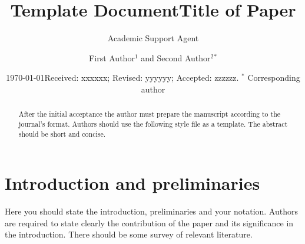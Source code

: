 \documentclass{article}
\title{Template Document}
\author{Academic Support Agent}
\date{\today}
\begin{document}
\maketitle

\setcounter{page}{1}




\centerline{}

\centerline{}

\title[Short Title]{Title of Paper}

\author[F. Author, S. Author]{First Author$^1$ and Second Author$^2$$^{*}$}

\address{$^{1}$ Department of Mathematics, University of California, San Diego, USA.}
\email{\textcolor[rgb]{0.00,0.00,0.84}{first@amcs.org}}

\address{$^{2}$ Department of Statistics, Moscow State University, Moscow, Russia}
\email{\textcolor[rgb]{0.00,0.00,0.84}{second@amcs.org}}




\date{Received: xxxxxx; Revised: yyyyyy; Accepted: zzzzzz.
\newline \indent $^{*}$ Corresponding author}

\begin{abstract}
After the initial acceptance the author must prepare the manuscript according to the journal's format. Authors should use the following style file as a template. The abstract should be short and concise.
\end{abstract} \maketitle

\section{Introduction and preliminaries}

\noindent Here you should state the introduction, preliminaries and
your notation. Authors are required to state clearly the
contribution of the paper and its significance in the introduction.
There should be some survey of relevant literature.
\end{document}
